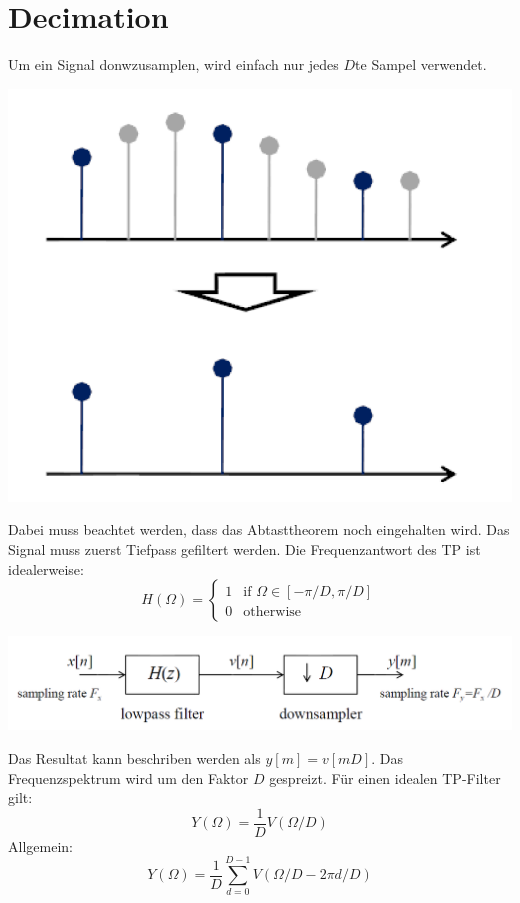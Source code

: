 \section{Decimation}
Um ein Signal donwzusamplen, wird einfach nur jedes $D$te Sampel verwendet.
\begin{center}
	\includegraphics[scale=.7]{../fig/downsample}
\end{center}
Dabei muss beachtet werden, dass das Abtasttheorem noch eingehalten wird. Das
Signal muss zuerst Tiefpass gefiltert werden. Die Frequenzantwort des TP ist
idealerweise:
\[ H(\Omega) = \left\lbrace \begin{matrix}
	1 & \textrm{if } \Omega \in [-\pi/D,\pi/D]\\
	0 & \textrm{otherwise}
\end{matrix} \right. \] 
\begin{center}
	\includegraphics[scale=.7]{../fig/decimation}
\end{center}
Das Resultat kann beschriben werden als $y[m] = v[mD]$. Das Frequenzspektrum
wird um den Faktor $D$ gespreizt. Für einen idealen TP-Filter gilt:
\[ Y(\Omega) = \frac{1}{D} V(\Omega/D)  \]
Allgemein:
\[ Y(\Omega) = \frac{1}{D} \sum_{d=0}^{D-1} V(\Omega/D-2\pi d/D) \]
